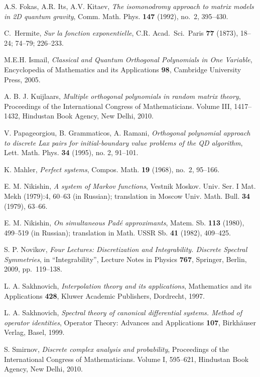 \documentclass{amsart}
\theoremstyle{remark}
\numberwithin{equation}{section}
\begin{document}
\begin{thebibliography}{99}
A.S. Fokas, A.R. Its, A.V. Kitaev, 
\textit{The isomonodromy approach to matrix models in 2D quantum gravity},
Comm. Math. Phys. \textbf{147} (1992), no.~2, 395--430.

C.~Hermite,
\textit{Sur la fonction exponentielle},
C.R. Acad.\ Sci.\ Paris \textbf{77} (1873), 18--24; 74--79; 226--233.

M.E.H. Ismail,
\textit{Classical and Quantum Orthogonal Polynomials in One Variable},
Encyclopedia of Mathematics and its Applications \textbf{98},
Cambridge University Press, 2005.

A. B. J. Kuijlaars, 
\textit{Multiple orthogonal polynomials in random matrix theory}, 
Proceedings of the International Congress of Mathematicians. Volume III, 1417--1432, 
Hindustan Book Agency, New Delhi, 2010.

V. Papageorgiou, B. Grammaticos, A. Ramani, 
\textit{Orthogonal polynomial approach to discrete Lax pairs for initial-boundary value problems of the QD algorithm}, 
Lett. Math. Phys. \textbf{34} (1995), no. 2, 91--101.

K. Mahler,
\textit{Perfect systems},
Compos. Math. \textbf{19} (1968), no.~2,  95--166.

E. M. Nikishin, 
\textit{A system of Markov functions}, 
Vestnik Moskov. Univ. Ser. I Mat. Mekh (1979):4, 60--63 (in Russian); translation in Moscow Univ. Math. Bull. \textbf{34} (1979), 63--66.

E. M. Nikishin, 
\textit{On simultaneous Pad\'e approximants}, 
Matem. Sb. \textbf{113} (1980), 499--519 (in Russian); translation in Math. USSR Sb.  \textbf{41} (1982), 409--425.

S. P. Novikov,
\textit{Four Lectures: Discretization and Integrability. Discrete Spectral Symmetries}, 
in ``Integrability'',
Lecture Notes in Physics \textbf{767}, Springer, Berlin, 2009, pp.~119--138.

L. A. Sakhnovich, 
\textit{Interpolation theory and its applications}, 
Mathematics and its Applications \textbf{428},
Kluwer Academic Publishers, Dordrecht, 1997.

L. A. Sakhnovich, 
\textit{Spectral theory of canonical differential systems. Method of operator identities},
Operator Theory: Advances and Applications \textbf{107}, Birkh\"auser Verlag, Basel, 1999.

S. Smirnov, 
\textit{Discrete complex analysis and probability}, 
Proceedings of the International Congress of Mathematicians. Volume I, 595--621, 
Hindustan Book Agency, New Delhi, 2010.


\end{thebibliography}
\end{document}
